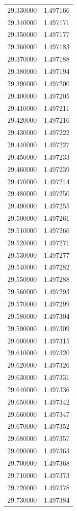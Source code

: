 \begin{tabular}{rr}
29.330000 & 1.497166 \\
29.340000 & 1.497171 \\
29.350000 & 1.497177 \\
29.360000 & 1.497183 \\
29.370000 & 1.497188 \\
29.380000 & 1.497194 \\
29.390000 & 1.497200 \\
29.400000 & 1.497205 \\
29.410000 & 1.497211 \\
29.420000 & 1.497216 \\
29.430000 & 1.497222 \\
29.440000 & 1.497227 \\
29.450000 & 1.497233 \\
29.460000 & 1.497239 \\
29.470000 & 1.497244 \\
29.480000 & 1.497250 \\
29.490000 & 1.497255 \\
29.500000 & 1.497261 \\
29.510000 & 1.497266 \\
29.520000 & 1.497271 \\
29.530000 & 1.497277 \\
29.540000 & 1.497282 \\
29.550000 & 1.497288 \\
29.560000 & 1.497293 \\
29.570000 & 1.497299 \\
29.580000 & 1.497304 \\
29.590000 & 1.497309 \\
29.600000 & 1.497315 \\
29.610000 & 1.497320 \\
29.620000 & 1.497326 \\
29.630000 & 1.497331 \\
29.640000 & 1.497336 \\
29.650000 & 1.497342 \\
29.660000 & 1.497347 \\
29.670000 & 1.497352 \\
29.680000 & 1.497357 \\
29.690000 & 1.497363 \\
29.700000 & 1.497368 \\
29.710000 & 1.497373 \\
29.720000 & 1.497378 \\
29.730000 & 1.497384 \\

\end{tabular}
